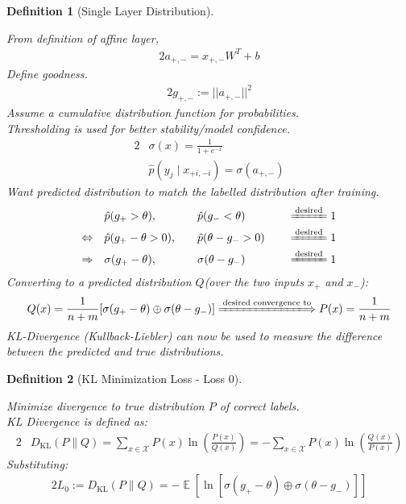 \documentclass[12pt]{iopart}
\theoremstyle{break}
\newtheorem{prop}{Definition}[section]
\DeclareMathOperator{\E}{\mathbb{E}}
\begin{document}
\begin{prop}[Single Layer Distribution]
\label{def:dists}
\begin{description}\item
From definition of affine layer, \begin{alignat}{2} a_{+,-} = x_{+,-}W^T + b \end{alignat}
Define goodness. \begin{alignat}{2} g_{+,-} := ||a_{+,-}||^2 \end{alignat}
Assume a cumulative distribution function for probabilities. \\
Thresholding is used for better stability/model confidence. 
\begin{alignat}{2}&\sigma(x) = \frac{1}{1+e^{-x}} \\
&\hat{p}(y_j \mid x_{+i,-i}) = \sigma(a_{+,-}) \end{alignat}
Want predicted distribution to match the labelled distribution after training.
\begin{alignat}{2}                    &\hat{p}(g_+ > \theta),\,&&\hat{p}(g_- < \theta) &&\xlongequal{\text{desired}} 1 \\
\Leftrightarrow\quad  &\hat{p}(g_+-\theta>0),\quad&&\hat{p}(\theta-g_->0) \quad&&\xlongequal{\text{desired}} 1 \\
\Rightarrow\quad      &\sigma(g_+-\theta),\,&&\sigma(\theta-g_-)       &&\xlongequal{\text{desired}} 1 \end{alignat}
Converting to a predicted distribution $Q$(over the two inputs $x_+$ and $x_-$):
\begin{alignat}{2}Q(x) = \frac{1}{n+m}[\sigma(g_+-\theta)\oplus\sigma(\theta-g_-)] \xLongrightarrow{\text{desired convergence to}} P(x) = \frac{1}{n+m} \end{alignat}
KL-Divergence (Kullback-Liebler) can now be used to measure the difference between the predicted and true distributions.
\end{description}
\end{prop}
\begin{prop}[KL Minimization Loss - Loss 0]
\label{def:maxloss}
\begin{description}\item
Minimize divergence to true distribution $P$ of correct labels. \\
KL Divergence is defined as:
\begin{alignat}{2}&D_\text{KL}(P \parallel Q) = \sum_{x\in\mathcal{X}} P(x) \ln\left(\frac{P(x)}{Q(x)}\right)
= -\sum_{x\in\mathcal{X}} P(x) \ln\left(\frac{Q(x)}{P(x)}\right)
\end{alignat}
Substituting:
\begin{alignat}{2}L_0 := D_\text{KL}(P \parallel Q) = -\E[\ln[\sigma(g_+-\theta)\oplus\sigma(\theta-g_-)]] \\
\end{alignat}
\end{description}
\end{prop}
\end{document}
